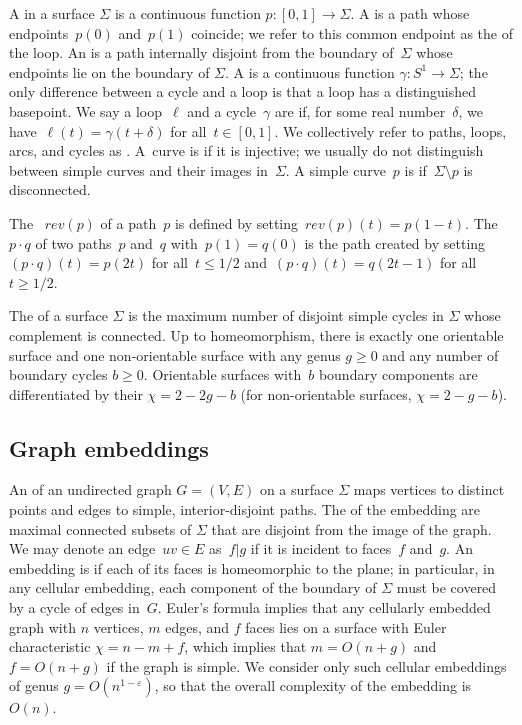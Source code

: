 \documentclass[11pt,twoside]{article}
\def\rev{\mathit{rev}}
\let\eps\varepsilon
\begin{document}
A  in a surface $\Sigma$ is a continuous function $p\colon [0,1]\to\Sigma$.
A  is a path whose endpoints~$p(0)$ and~$p(1)$ coincide;
we refer to this common endpoint as the  of the loop.
An  is a path internally disjoint from the boundary of~$\Sigma$
whose endpoints lie on the boundary of $\Sigma$.
A  is a continuous function $\gamma\colon S^1\to\Sigma$;
the only difference between a cycle and a loop is that a loop has a
distinguished basepoint.
We say a loop~$\ell$ and a cycle~$\gamma$ are  if, for some
real number~$\delta$, we have~$\ell(t) = \gamma(t + \delta)$ for
all~$t \in [0,1]$.
We collectively refer to paths, loops, arcs, and cycles as .
A~curve is  if it is injective; we usually do not distinguish between simple curves and their images in~$\Sigma$.
A simple curve~$p$ is  if~$\Sigma \setminus p$ is disconnected.

The ~$\rev(p)$ of a path~$p$ is defined by
setting~$\rev(p)(t) = p(1-t)$. The ~$p \cdot q$ of two
paths~$p$ and~$q$ with~$p(1)=q(0)$ is the path created by
setting~$(p\cdot q)(t) = p(2t)$ for all~$t \leq 1/2$
and~$(p\cdot q)(t) = q(2t-1)$ for all~$t \geq 1/2$.

The  of a surface $\Sigma$ is the maximum number of disjoint simple cycles in $\Sigma$ whose complement is connected.
 Up to homeomorphism,
there is exactly one orientable surface and one non-orientable surface with any genus $g\ge 0$ and any number of
boundary cycles $b\ge 0$.
Orientable surfaces with~$b$ boundary components are differentiated by their  ${\chi = 2 - 2g - b}$ (for non-orientable surfaces, ${\chi = 2 - g - b}$).


\subsection{Graph embeddings}
\label{SS:embeddings}


An  of an undirected graph $G=(V,E)$ on a surface $\Sigma$ maps vertices to distinct points and edges to simple, interior-disjoint paths.  The  of the embedding are maximal connected subsets of $\Sigma$ that are disjoint from the image of the graph.
We may denote an edge~$uv \in E$ as~$f | g$ if it is incident to faces~$f$ and~$g$.
An embedding is  if each of its faces is homeomorphic to the plane; in particular, in any cellular embedding, each component of the boundary of $\Sigma$ must be covered by a cycle of edges in~$G$.  Euler's formula implies that any cellularly embedded graph with $n$ vertices, $m$ edges, and $f$ faces lies on a surface with Euler characteristic $\chi = n-m+f$, which implies that $m = O(n+g)$ and $f=O(n+g)$
if the graph is simple.
We consider only such
cellular embeddings of genus $g=O(n^{1-\eps})$, so that the overall complexity of the embedding is $O(n)$.
\end{document}
